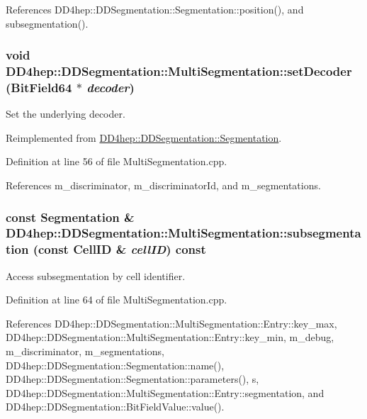 References DD4hep::DDSegmentation::Segmentation::position(), and subsegmentation().\hypertarget{class_d_d4hep_1_1_d_d_segmentation_1_1_multi_segmentation_a21a046717c1aae25d103dddeb2829cb9}{
\subsubsection[{setDecoder}]{\setlength{\rightskip}{0pt plus 5cm}void DD4hep::DDSegmentation::MultiSegmentation::setDecoder ({\bf BitField64} $\ast$ {\em decoder})}}
\label{class_d_d4hep_1_1_d_d_segmentation_1_1_multi_segmentation_a21a046717c1aae25d103dddeb2829cb9}


Set the underlying decoder. 

Reimplemented from \hyperlink{class_d_d4hep_1_1_d_d_segmentation_1_1_segmentation_ab5973bc06538d13b1991f55e40635fa0}{DD4hep::DDSegmentation::Segmentation}.

Definition at line 56 of file MultiSegmentation.cpp.

References m\_\-discriminator, m\_\-discriminatorId, and m\_\-segmentations.\hypertarget{class_d_d4hep_1_1_d_d_segmentation_1_1_multi_segmentation_aa5766661f6e3194f4bc782b84e7636be}{
\subsubsection[{subsegmentation}]{\setlength{\rightskip}{0pt plus 5cm}const {\bf Segmentation} \& DD4hep::DDSegmentation::MultiSegmentation::subsegmentation (const {\bf CellID} \& {\em cellID}) const}}
\label{class_d_d4hep_1_1_d_d_segmentation_1_1_multi_segmentation_aa5766661f6e3194f4bc782b84e7636be}


Access subsegmentation by cell identifier. 

Definition at line 64 of file MultiSegmentation.cpp.

References DD4hep::DDSegmentation::MultiSegmentation::Entry::key\_\-max, DD4hep::DDSegmentation::MultiSegmentation::Entry::key\_\-min, m\_\-debug, m\_\-discriminator, m\_\-segmentations, DD4hep::DDSegmentation::Segmentation::name(), DD4hep::DDSegmentation::Segmentation::parameters(), s, DD4hep::DDSegmentation::MultiSegmentation::Entry::segmentation, and DD4hep::DDSegmentation::BitFieldValue::value().

